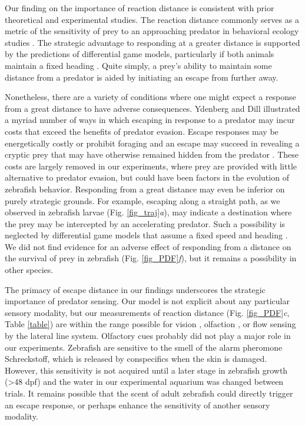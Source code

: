 \documentclass[]{rsos}%
\begin{document}
Our finding on the importance of reaction distance is consistent with prior theoretical and experimental studies.
The reaction distance commonly serves as a metric of the sensitivity of prey to an approaching predator in behavioral ecology studies \cite{Cooper:2015vf}.
The strategic advantage to responding at a greater distance is supported by the predictions of differential game models, particularly if both animals maintain a fixed heading \cite{Isaacs:1965uz,Weihs:1984tb,Soto:2015cj}. 
Quite simply, a prey's ability to maintain some distance from a predator is aided by initiating an escape from further away.

Nonetheless, there are a variety of conditions where one might expect a response from a great distance to have adverse consequences.
Ydenberg and Dill \cite{Ydenberg:1986tm} illustrated a myriad number of ways in which escaping in response to a predator may incur costs that exceed the benefits of predator evasion.
Escape responses may be energetically costly or prohibit foraging and an escape may succeed in revealing a cryptic prey that may have otherwise remained hidden from the predator \cite{Cooper:2015vf,Broom:2005gq}.
These costs are largely removed in our experiments, where prey are provided with little alternative to predator evasion, but could have been factors in the evolution of zebrafish behavior.
Responding from a great distance may even be inferior on purely strategic grounds. 
For example, escaping along a straight path, as we observed in zebrafish larvae (Fig. \ref{fig_traj}\textit{a}), may indicate a destination where the prey may be intercepted by an accelerating predator. 
Such a possibility is neglected by differential game models that assume a fixed speed and heading \cite{Weihs:1984tb, Isaacs:1965uz}.
We did not find evidence for an adverse effect of responding from a distance on the survival of prey in zebrafish (Fig. \ref{fig_PDF}\textit{f}), but it remains a possibility in other species.

The primacy of escape distance in our findings underscores the strategic importance of predator sensing. 
Our model is not explicit about any particular sensory modality, but our measurements of reaction distance (Fig. \ref{fig_PDF}\textit{c}, Table \ref{table}) are within the range possible for vision \cite{Dunn:2016jt}, olfaction \cite{Waldman:1982ic}, or flow sensing by the lateral line system.
Olfactory cues probably did not play a major role in our experiments. 
Zebrafish are sensitive to the smell of the alarm pheromone Schreckstoff, which is released by conspecifics when the skin is damaged. 
However, this sensitivity is not acquired until a later stage in zebrafish growth (>48 dpf) \cite{Waldman:1982ic} and the water in our experimental aquarium was changed between trials.
It remains possible that the scent of adult zebrafish could directly trigger an escape response, or perhaps enhance the sensitivity of another sensory modality.
\end{document}
